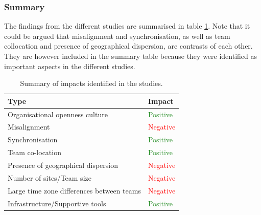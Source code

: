 \subsubsection{Summary}

The findings from the different studies are summarised in table \ref{summary}. Note that it could be argued that misalignment and synchronisation, as well as team collocation and presence of geographical dispersion, are contrasts of each other. They are however included in the summary table because they were identified as important aspects in the different studies.

\begin{table}[H]
\begin{center}
    \begin{tabular}{ | p{8cm} | p{6cm} |}
    \hline
    \textbf{Type} & \textbf{Impact} \\ \hline
    Organisational openness culture & \textcolor{ForestGreen}{Positive} \\ \hline
    Misalignment & \textcolor{red}{Negative} \\ \hline
    Synchronisation & \textcolor{ForestGreen}{Positive} \\ \hline
    Team co-location & \textcolor{ForestGreen}{Positive} \\ \hline
    Presence of geographical dispersion & \textcolor{red}{Negative} \\ \hline
    Number of sites/Team size & \textcolor{red}{Negative} \\ \hline
    Large time zone differences between teams & \textcolor{red}{Negative} \\ \hline
    Infrastructure/Supportive tools & \textcolor{ForestGreen}{Positive} \\ \hline
    \end{tabular}
    \caption{Summary of impacts identified in the studies.}
    \label{summary}
\end{center}
\end{table}

